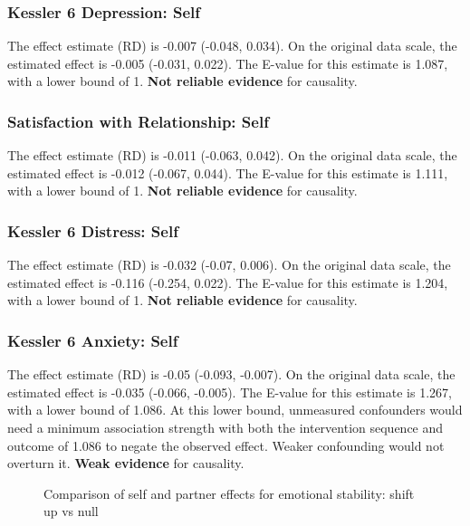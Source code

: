 \documentclass[
  singlecolumn]{article}
\begin{document}
\subsubsection{Kessler 6 Depression:
Self}\label{kessler-6-depression-self-4}

The effect estimate (RD) is -0.007 (-0.048, 0.034). On the original data
scale, the estimated effect is -0.005 (-0.031, 0.022). The E-value for
this estimate is 1.087, with a lower bound of 1. \textbf{Not reliable
evidence} for causality.

\subsubsection{Satisfaction with Relationship:
Self}\label{satisfaction-with-relationship-self-4}

The effect estimate (RD) is -0.011 (-0.063, 0.042). On the original data
scale, the estimated effect is -0.012 (-0.067, 0.044). The E-value for
this estimate is 1.111, with a lower bound of 1. \textbf{Not reliable
evidence} for causality.

\subsubsection{Kessler 6 Distress:
Self}\label{kessler-6-distress-self-4}

The effect estimate (RD) is -0.032 (-0.07, 0.006). On the original data
scale, the estimated effect is -0.116 (-0.254, 0.022). The E-value for
this estimate is 1.204, with a lower bound of 1. \textbf{Not reliable
evidence} for causality.

\subsubsection{Kessler 6 Anxiety: Self}\label{kessler-6-anxiety-self-4}

The effect estimate (RD) is -0.05 (-0.093, -0.007). On the original data
scale, the estimated effect is -0.035 (-0.066, -0.005). The E-value for
this estimate is 1.267, with a lower bound of 1.086. At this lower
bound, unmeasured confounders would need a minimum association strength
with both the intervention sequence and outcome of 1.086 to negate the
observed effect. Weaker confounding would not overturn it. \textbf{Weak
evidence} for causality.

\begin{figure}


\caption{\label{fig-results-emotional-stability-self-partner-up-comparison}Comparison
of self and partner effects for emotional stability: shift up vs null}

\end{figure}%
\end{document}
